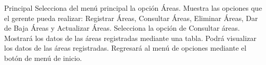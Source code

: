 	\begin{UCtrayectoria}{Principal}
		\UCpaso[\UCactor] Selecciona del menú principal la opción Áreas.
		\UCpaso Muestra las opciones que el gerente pueda realizar: Registrar Áreas, Consultar Áreas, 			Eliminar Áreas, Dar de Baja Áreas y Actualizar Áreas.
		\UCpaso[\UCactor] Selecciona la opción de Consultar áreas.
		\UCpaso Mostrará los datos de las áreas registradas mediante una tabla.
		\UCpaso[\UCactor] Podrá visualizar los datos de las áreas registradas.
		\UCpaso[\UCactor] Regresará al menú de opciones mediante el botón de menú de inicio.
				
	\end{UCtrayectoria}
